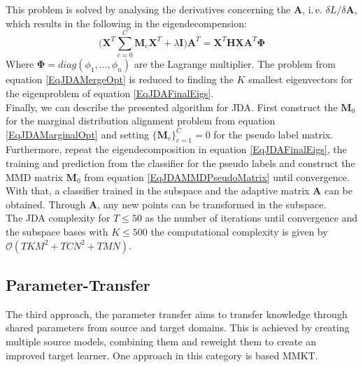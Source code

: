 This problem is solved by analysing the derivatives concerning the $\mathbf{A}$, i.\,e. $\delta L / \delta \mathbf{A}$, which results in the following in the eigendecompension:\cite{Long.}
\begin{equation}\label{EqJDAFinalEigs}
\bigg(\mathbf{X}^T \sum_{c=0}^{C} \mathbf{M}_c\mathbf{X}^T+\lambda\mathbf{I}\bigg)\mathbf{A}^T = \mathbf{X}^T\mathbf{HX}\mathbf{A}^T\boldsymbol{\Phi}
\end{equation}
Where $\boldsymbol{\Phi} = diag(\phi_1,\dots,\phi_n)$ are the Lagrange multiplier.
The problem from equation \eqref{EqJDAMergeOpt} is reduced to finding the $K$ smallest eigenvectors for the eigenproblem of equation \eqref{EqJDAFinalEigs}.\cite{Long.}\\
Finally, we can describe the presented algorithm for \acs{JDA}.
First construct the $\mathbf{M}_0$ for the marginal distribution alignment problem from equation \eqref{EqJDAMarginalOpt} and setting $\{\mathbf{M}_c\}_{c=1}^C = 0$ for the pseudo label matrix.
Furthermore, repeat the eigendecomposition in equation \eqref{EqJDAFinalEigs}, the training and prediction from the classifier for the pseudo labels and construct the \acs{MMD} matrix $\mathbf{M}_0$ from equation \eqref{EqJDAMMDPseudoMatrix} until convergence.\cite{Long.}\\
With that, a classifier trained in the subspace and the adaptive matrix $\mathbf{A}$ can be obtained.
Through $\mathbf{A}$, any new points can be transformed in the subspace.\cite{Long.}\\
The \acs{JDA} complexity for $T\le 50$ as the number of iterations until convergence and the subspace bases with $K\le 500$ the computational complexity is given by $\mathcal{O}(TKM^2+TCN^2+TMN)$.\cite{Long.}
\subsection{Parameter-Transfer}\label{TlSubSecPara}
The third approach, the parameter transfer aims to transfer knowledge through shared parameters from source and target domains.
This is achieved by creating multiple source models, combining them and reweight them to create an improved target learner.
One approach in this category is based \ac{MMKT}.\cite[p. 7-8]{Weiss.2016}
